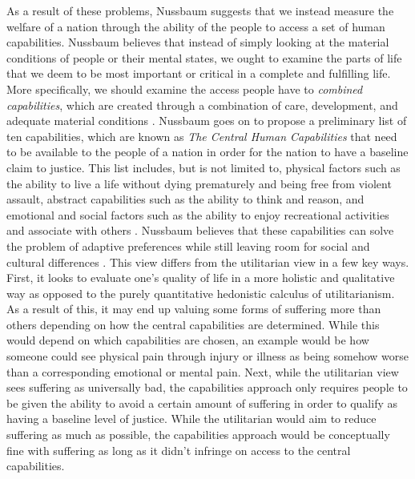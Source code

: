 \documentclass[12pt]{article}
\begin{document}
As a result of these problems, Nussbaum suggests that we instead measure the welfare of a nation through the ability of the people to access a set of human capabilities.
Nussbaum believes that instead of simply looking at the material conditions of people or their mental states, we ought to examine the parts of life that we deem to be most important or critical in a complete and fulfilling life.
More specifically, we should examine the access people have to \emph{combined capabilities}, which are created through a combination of care, development, and adequate material conditions \autocite[240]{nussbaum2019}.
Nussbaum goes on to propose a preliminary list of ten capabilities, which are known as \emph{The Central Human Capabilities} that need to be available to the people of a nation in order for the nation to have a baseline claim to justice.
This list includes, but  is not limited to, physical factors such as the ability to live a life without dying prematurely and being free from violent assault, abstract capabilities such as the ability to think and reason, and emotional and social factors such as the ability to enjoy recreational activities and associate with others \autocite[242]{nussbaum2019}.
Nussbaum believes that these capabilities can solve the problem of adaptive preferences while still leaving room for social and cultural differences \autocite[243]{nussbaum2019}.
This view differs from the utilitarian view in a few key ways.
First, it looks to evaluate one's quality of life in a more holistic and qualitative way as opposed to the purely quantitative hedonistic calculus of utilitarianism.
As a result of this, it may end up valuing some forms of suffering more than others depending on how the central capabilities are determined.
While this would depend on which capabilities are chosen, an example would be how someone could see physical pain through injury or illness as being somehow worse than a corresponding emotional or mental pain.
Next, while the utilitarian view sees suffering as universally bad, the capabilities approach only requires people to be given the ability to avoid a certain amount of suffering in order to qualify as having a baseline level of justice.
While the utilitarian would aim to reduce suffering as much as possible, the capabilities approach would be conceptually fine with suffering as long as it didn't infringe on access to the central capabilities.
\end{document}
